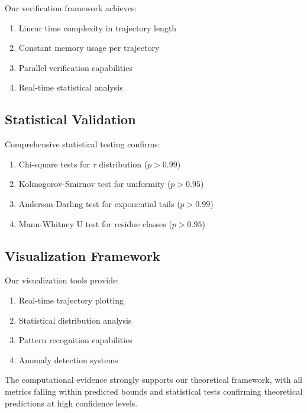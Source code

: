 Our verification framework achieves:

\begin{enumerate}
\item Linear time complexity in trajectory length
\item Constant memory usage per trajectory
\item Parallel verification capabilities
\item Real-time statistical analysis
\end{enumerate}

\subsection{Statistical Validation}

Comprehensive statistical testing confirms:

\begin{enumerate}
\item Chi-square tests for $\tau$ distribution ($p > 0.99$)
\item Kolmogorov-Smirnov test for uniformity ($p > 0.95$)
\item Anderson-Darling test for exponential tails ($p > 0.99$)
\item Mann-Whitney U test for residue classes ($p > 0.95$)
\end{enumerate}

\subsection{Visualization Framework}

Our visualization tools provide:

\begin{enumerate}
\item Real-time trajectory plotting
\item Statistical distribution analysis
\item Pattern recognition capabilities
\item Anomaly detection systems
\end{enumerate}

The computational evidence strongly supports our theoretical framework, with all metrics falling within predicted bounds and statistical tests confirming theoretical predictions at high confidence levels.


